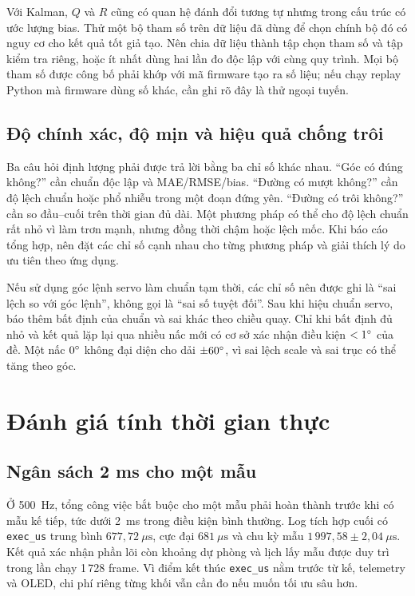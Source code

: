 Với Kalman, $Q$ và $R$ cũng có quan hệ đánh đổi tương tự nhưng trong cấu trúc có ước lượng bias. Thử một bộ tham số trên dữ liệu đã dùng để chọn chính bộ đó có nguy cơ cho kết quả tốt giả tạo. Nên chia dữ liệu thành tập chọn tham số và tập kiểm tra riêng, hoặc ít nhất dùng hai lần đo độc lập với cùng quy trình. Mọi bộ tham số được công bố phải khớp với mã firmware tạo ra số liệu; nếu chạy replay Python mà firmware dùng số khác, cần ghi rõ đây là thử ngoại tuyến.

\subsection{Độ chính xác, độ mịn và hiệu quả chống trôi}
Ba câu hỏi định lượng phải được trả lời bằng ba chỉ số khác nhau. ``Góc có đúng không?'' cần chuẩn độc lập và MAE/RMSE/bias. ``Đường có mượt không?'' cần độ lệch chuẩn hoặc phổ nhiễu trong một đoạn đứng yên. ``Đường có trôi không?'' cần so đầu--cuối trên thời gian đủ dài. Một phương pháp có thể cho độ lệch chuẩn rất nhỏ vì làm trơn mạnh, nhưng đồng thời chậm hoặc lệch mốc. Khi báo cáo tổng hợp, nên đặt các chỉ số cạnh nhau cho từng phương pháp và giải thích lý do ưu tiên theo ứng dụng.

Nếu sử dụng góc lệnh servo làm chuẩn tạm thời, các chỉ số nên được ghi là ``sai lệch so với góc lệnh'', không gọi là ``sai số tuyệt đối''. Sau khi hiệu chuẩn servo, báo thêm bất định của chuẩn và sai khác theo chiều quay. Chỉ khi bất định đủ nhỏ và kết quả lặp lại qua nhiều nấc mới có cơ sở xác nhận điều kiện $<1^{\circ}$ của đề. Một nấc $0^{\circ}$ không đại diện cho dải $\pm60^{\circ}$, vì sai lệch scale và sai trục có thể tăng theo góc.

\section{Đánh giá tính thời gian thực}
\subsection{Ngân sách 2 ms cho một mẫu}
Ở 500~Hz, tổng công việc bắt buộc cho một mẫu phải hoàn thành trước khi có mẫu kế tiếp, tức dưới 2~ms trong điều kiện bình thường. Log tích hợp cuối có \texttt{exec\_us} trung bình $677{,}72~\mu\mathrm{s}$, cực đại $681~\mu\mathrm{s}$ và chu kỳ mẫu $1\,997{,}58\pm2{,}04~\mu\mathrm{s}$. Kết quả xác nhận phần lõi còn khoảng dự phòng và lịch lấy mẫu được duy trì trong lần chạy 1\,728 frame. Vì điểm kết thúc \texttt{exec\_us} nằm trước từ kế, telemetry và OLED, chi phí riêng từng khối vẫn cần đo nếu muốn tối ưu sâu hơn.

